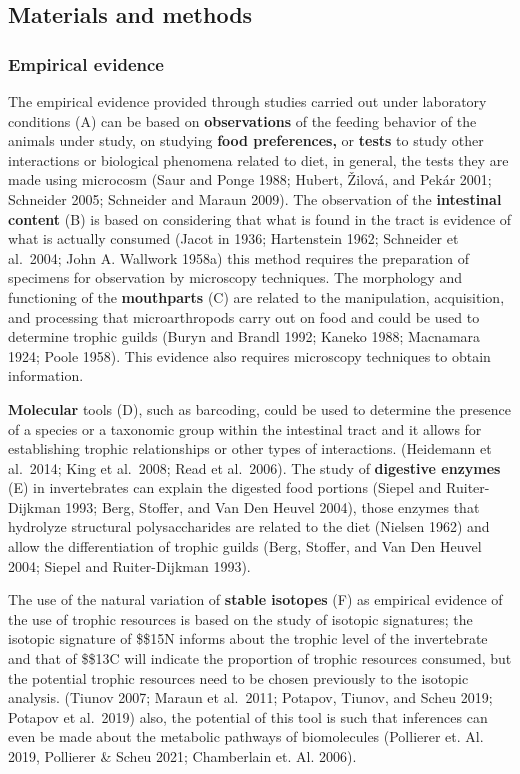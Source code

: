 \documentclass[10pt,oneside]{article}
\begin{document}
\hypertarget{materials-and-methods}{%
\subsection{Materials and methods}\label{materials-and-methods}}

\hypertarget{empirical-evidence}{%
\subsubsection{Empirical evidence}\label{empirical-evidence}}

The empirical evidence provided through studies carried out under
laboratory conditions (A) can be based on \textbf{observations} of the
feeding behavior of the animals under study, on studying \textbf{food
preferences,} or \textbf{tests} to study other interactions or
biological phenomena related to diet, in general, the tests they are
made using microcosm (Saur and Ponge 1988; Hubert, Žilová, and Pekár
2001; Schneider 2005; Schneider and Maraun 2009). The observation of the
\textbf{intestinal content} (B) is based on considering that what is
found in the tract is evidence of what is actually consumed (Jacot in
1936; Hartenstein 1962; Schneider et al.~2004; John A. Wallwork 1958a)
this method requires the preparation of specimens for observation by
microscopy techniques. The morphology and functioning of the
\textbf{mouthparts} (C) are related to the manipulation, acquisition,
and processing that microarthropods carry out on food and could be used
to determine trophic guilds (Buryn and Brandl 1992; Kaneko 1988;
Macnamara 1924; Poole 1958). This evidence also requires microscopy
techniques to obtain information.

\textbf{Molecular} tools (D), such as barcoding, could be used to
determine the presence of a species or a taxonomic group within the
intestinal tract and it allows for establishing trophic relationships or
other types of interactions. (Heidemann et al.~2014; King et al.~2008;
Read et al.~2006). The study of \textbf{digestive enzymes} (E) in
invertebrates can explain the digested food portions (Siepel and
Ruiter-Dijkman 1993; Berg, Stoffer, and Van Den Heuvel 2004), those
enzymes that hydrolyze structural polysaccharides are related to the
diet (Nielsen 1962) and allow the differentiation of trophic guilds
(Berg, Stoffer, and Van Den Heuvel 2004; Siepel and Ruiter-Dijkman
1993).

The use of the natural variation of \textbf{stable isotopes} (F) as
empirical evidence of the use of trophic resources is based on the study
of isotopic signatures; the isotopic signature of \$\delta\$15N informs
about the trophic level of the invertebrate and that of \$\delta\$13C
will indicate the proportion of trophic resources consumed, but the
potential trophic resources need to be chosen previously to the isotopic
analysis. (Tiunov 2007; Maraun et al.~2011; Potapov, Tiunov, and Scheu
2019; Potapov et al.~2019) also, the potential of this tool is such that
inferences can even be made about the metabolic pathways of biomolecules
(Pollierer et. Al. 2019, Pollierer \& Scheu 2021; Chamberlain et. Al.
2006).
\end{document}
